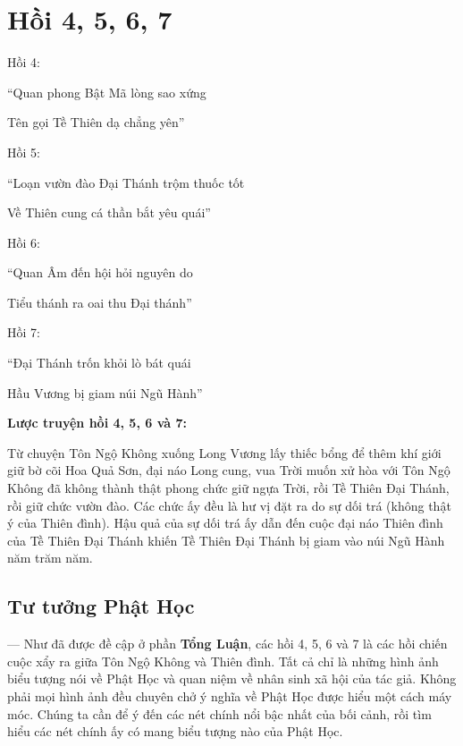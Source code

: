 \chapter{Hồi 4, 5, 6, 7} %
\label{cha:hoi_4_5_6_7}

Hồi 4:

\begin{itshape}
``Quan phong Bật Mã lòng sao xứng

Tên gọi Tề Thiên dạ chẳng yên''
\end{itshape}

Hồi 5:

\begin{itshape}
``Loạn vườn đào Đại Thánh trộm thuốc tốt

Về Thiên cung cá thần bắt yêu quái''
\end{itshape}

Hồi 6:

\begin{itshape}
``Quan Âm đến hội hỏi nguyên do

Tiểu thánh ra oai thu Đại thánh''
\end{itshape}

Hồi 7:

\begin{itshape}
``Đại Thánh trốn khỏi lò bát quái

Hầu Vương bị giam núi Ngũ Hành''
\end{itshape}

{\bf Lược truyện hồi 4, 5, 6 và 7:}

Từ chuyện Tôn Ngộ Không xuống Long Vương lấy thiếc bổng để thêm khí giới giữ bờ cõi Hoa Quả Sơn, đại náo Long cung, vua Trời muốn xử hòa với Tôn Ngộ Không đã không thành thật phong chức giữ ngựa Trời, rồi Tề Thiên Đại Thánh, rồi giữ chức vườn đào. Các chức ấy đều là hư vị đặt ra do sự dối trá (không thật ý của Thiên đình). Hậu quả của sự dối trá ấy dẫn đến cuộc đại náo Thiên đình của Tề Thiên Đại Thánh khiến Tề Thiên Đại Thánh bị giam vào núi Ngũ Hành năm trăm năm.

\section{Tư tưởng Phật Học} %
\label{sec:4_phat_hoc}

— Như đã được đề cập ở phần {\bf Tổng Luận}, các hồi 4, 5, 6 và 7 là các hồi chiến cuộc xẩy ra giữa Tôn Ngộ Không và Thiên đình. Tất cả chỉ là những hình ảnh biểu tượng nói về Phật Học và quan niệm về nhân sinh xã hội của tác giả. Không phải mọi hình ảnh đều chuyên chở ý nghĩa về Phật Học được hiểu một cách máy móc. Chúng ta cần để ý đến các nét chính nổi bậc nhất của bối cảnh, rồi tìm hiểu các nét chính  ấy có mang biểu tượng nào của Phật Học.

